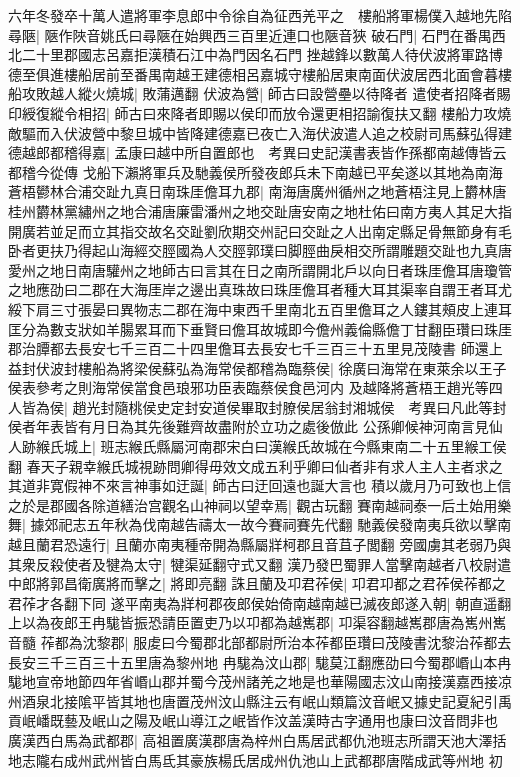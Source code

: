 六年冬發卒十萬人遣將軍李息郎中令徐自為征西羌平之　樓船將軍楊僕入越地先陷尋陿|{
	陿作陜音姚氏曰尋陿在始興西三百里近連口也陿音狹}
破石門|{
	石門在番禺西北二十里郡國志呂嘉拒漢積石江中為門因名石門}
挫越鋒以數萬人待伏波將軍路博德至俱進樓船居前至番禺南越王建德相呂嘉城守樓船居東南面伏波居西北面會暮樓船攻敗越人縱火燒城|{
	敗蒲邁翻}
伏波為營|{
	師古曰設營壘以待降者}
遣使者招降者賜印綬復縱令相招|{
	師古曰來降者即賜以侯印而放令還更相招諭復扶又翻}
樓船力攻燒敵驅而入伏波營中黎旦城中皆降建德嘉已夜亡入海伏波遣人追之校尉司馬蘇弘得建德越郎都稽得嘉|{
	孟康曰越中所自置郎也　考異曰史記漢書表皆作孫都南越傳皆云都稽今從傳}
戈船下瀨將軍兵及馳義侯所發夜郎兵未下南越已平矣遂以其地為南海蒼梧鬰林合浦交趾九真日南珠厓儋耳九郡|{
	南海唐廣州循州之地蒼梧注見上欝林唐桂州欝林黨繡州之地合浦唐廉雷潘州之地交趾唐安南之地杜佑曰南方夷人其足大指開廣若並足而立其指交故名交趾劉欣期交州記曰交趾之人出南定縣足骨無節身有毛卧者更扶乃得起山海經交脛國為人交脛郭璞曰脚脛曲戾相交所謂雕題交趾也九真唐愛州之地日南唐驩州之地師古曰言其在日之南所謂開北戶以向日者珠厓儋耳唐瓊管之地應劭曰二郡在大海厓岸之邊出真珠故曰珠厓儋耳者種大耳其渠率自謂王者耳尤綏下肩三寸張晏曰異物志二郡在海中東西千里南北五百里儋耳之人鏤其頰皮上連耳匡分為數支狀如羊腸累耳而下垂賢曰儋耳故城即今儋州義倫縣儋丁甘翻臣瓚曰珠厓郡治䐺都去長安七千三百二十四里儋耳去長安七千三百三十五里見茂陵書}
師還上益封伏波封樓船為將梁侯蘇弘為海常侯都稽為臨蔡侯|{
	徐廣曰海常在東萊余以王子侯表參考之則海常侯當食邑琅邪功臣表臨蔡侯食邑河内}
及越降將蒼梧王趙光等四人皆為侯|{
	趙光封隨桃侯史定封安道侯畢取封膫侯居翁封湘城侯　考異曰凡此等封侯者年表皆有月日為其先後難齊故盡附於立功之處後倣此}
公孫卿候神河南言見仙人跡緱氏城上|{
	班志緱氏縣屬河南郡宋白曰漢緱氏故城在今縣東南二十五里緱工侯翻}
春天子親幸緱氏城視跡問卿得毋效文成五利乎卿曰仙者非有求人主人主者求之其道非寛假神不來言神事如迂誕|{
	師古曰迂回遠也誕大言也}
積以歲月乃可致也上信之於是郡國各除道繕治宫觀名山神祠以望幸焉|{
	觀古玩翻}
賽南越祠泰一后土始用樂舞|{
	據郊祀志五年秋為伐南越告禱太一故今賽祠賽先代翻}
馳義侯發南夷兵欲以擊南越且蘭君恐遠行|{
	且蘭亦南夷種帝開為縣屬牂柯郡且音苴子閭翻}
旁國虜其老弱乃與其衆反殺使者及犍為太守|{
	犍渠延翻守式又翻}
漢乃發巴蜀罪人當擊南越者八校尉遣中郎將郭昌衛廣將而擊之|{
	將即亮翻}
誅且蘭及卭君莋侯|{
	卭君卭都之君莋侯莋都之君莋才各翻下同}
遂平南夷為牂柯郡夜郎侯始倚南越南越已滅夜郎遂入朝|{
	朝直遥翻}
上以為夜郎王冉駹皆振恐請臣置吏乃以卭都為越嶲郡|{
	卭渠容翻越嶲郡唐為嶲州嶲音髓}
莋都為沈黎郡|{
	服䖍曰今蜀郡北部都尉所治本莋都臣瓚曰茂陵書沈黎治莋都去長安三千三百三十五里唐為黎州地}
冉駹為汶山郡|{
	駹莫江翻應劭曰今蜀郡㟭山本冉駹地宣帝地節四年省㟭山郡并蜀今茂州諸羌之地是也華陽國志汶山南接漢嘉西接凉州酒泉北接隂平皆其地也唐置茂州汶山縣注云有岷山類篇汶音岷又據史記夏紀引禹貢岷嶓既藝及岷山之陽及岷山導江之岷皆作汶盖漢時古字通用也康曰汶音問非也}
廣漢西白馬為武都郡|{
	高祖置廣漢郡唐為梓州白馬居武都仇池班志所謂天池大澤括地志隴右成州武州皆白馬氐其豪族楊氏居成州仇池山上武都郡唐階成武等州地}
初


